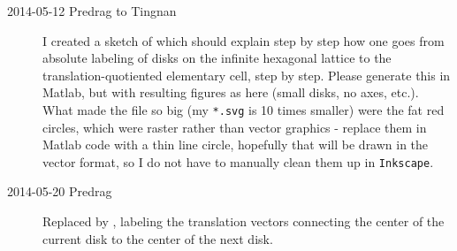 \begin{description}

\item[2014-05-12 Predrag to Tingnan]
I created a sketch of  which should explain step
by step how one goes from absolute labeling of disks on the infinite
hexagonal lattice to the translation-quotiented elementary cell, step by
step. Please generate this in Matlab, but with resulting figures as here
(small disks, no axes, etc.). What made the file so big (my
\texttt{*.svg} is 10 times smaller) were the fat red circles, which were
raster rather than vector graphics - replace them in Matlab code with a
thin line circle, hopefully that will be drawn in the vector format, so I
do not have to manually clean them up in \texttt{Inkscape}.

\item[2014-05-20 Predrag]
Replaced  by ,
labeling the translation vectors connecting the center of the current
disk to the center of the next disk.

\end{description}

